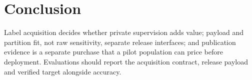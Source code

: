 \section{Conclusion}
\label{sec:conclusion}

Label acquisition decides whether private supervision adds value; payload
and partition fit, not raw sensitivity, separate release interfaces; and
publication evidence is a separate purchase that a pilot population can
price before deployment. Evaluations should report the acquisition
contract, release payload and verified target alongside accuracy.
